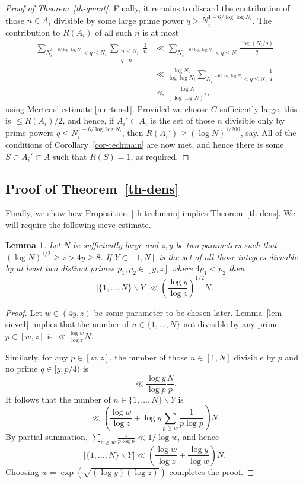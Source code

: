 \documentclass{amsart}
\newcommand{\abs}[1]{\left\lvert #1\right\rvert}
\newcommand{\brac}[1]{\left( #1\right)}
\newtheorem{lemma}{Lemma}
\begin{document}
\begin{proof}[Proof of Theorem~\ref{th-quant}]
Finally, it remains to discard the contribution of those $n\in A_i$ divisible by some large prime power $q> N_i^{1-6/\log\log N_i}$. The contribution to $R(A_i)$ of all such $n$ is at most
\begin{align*}
\sum_{N_i^{1-6/\log\log N_i}< q\leq N_i}\sum_{\substack{n\leq N_i\\ q\mid n}}\frac{1}{n}
&\ll \sum_{N_i^{1-6/\log\log N_i}< q\leq N_i}\frac{\log(N_i/q)}{q}\\
&\ll \frac{\log N_i}{\log\log N_i}\sum_{N_i^{1-6/\log\log N_i}<q\leq N_i}\frac{1}{q}\\
&\ll \frac{\log N}{(\log\log N)^2},
\end{align*}
using Mertens' estimate \eqref{mertens1}. Provided we choose $C$ sufficiently large, this is $\leq R(A_i)/2$, and hence, if $A_i'\subset A_i$ is the set of those $n$ divisible only by prime powers $q\leq N_i^{1-6/\log\log N_i}$, then $R(A_i')\geq (\log N)^{1/200}$, say. All of the conditions of Corollary~\ref{cor-techmain} are now met, and hence there is some $S\subset A_i'\subset A$ such that $R(S)=1$, as required.
\end{proof}

\subsection{Proof of Theorem~\ref{th-dens}}

Finally, we show how Proposition~\ref{th-techmain} implies Theorem~\ref{th-dens}. We will require the following sieve estimate.

\begin{lemma}\label{sieve2}
Let $N$ be sufficiently large and $z,y$ be two parameters such that $(\log N)^{1/2}\geq z>4y\geq 8$. If $Y\subset [1,N]$ is the set of all those integers divisible by at least two distinct primes $p_1,p_2\in [y,z]$ where $4p_1<p_2$ then
\[\abs{ \{1,\ldots,N\}\backslash Y}\ll \brac{\frac{\log y}{\log z}}^{1/2}N.\]
\end{lemma}
\begin{proof}
Let $w\in (4y,z)$ be some parameter to be chosen later. Lemma~\ref{lem-sieve1} implies that the number of $n\in \{1,\ldots,N\}$ not divisible by any prime $p\in [w,z]$ is $\ll \frac{\log w}{\log z}N$.

Similarly, for any $p\in [w,z]$, the number of those $n\in [1,N]$ divisible by $p$ and no prime  $q\in [y,p/4)$ is
\[\ll \frac{\log y}{\log p}\frac{N}{p}.\]
It follows that the number of $n\in\{1,\ldots,N\}\backslash Y$ is 
\[\ll \brac{\frac{\log w}{\log z}+ \log y\sum_{p\geq w}\frac{1}{p\log p}}N.\]
By partial summation, $\sum_{p\geq w}\frac{1}{p\log p}\ll 1/\log w$, and hence 
\[\abs{ \{1,\ldots,N\}\backslash Y}\ll \brac{\frac{\log w}{\log z}+\frac{ \log y}{\log w}}N.\]
Choosing $w=\exp\brac{\sqrt{(\log y)(\log z)}}$ completes the proof. 
\end{proof}
\end{document}
